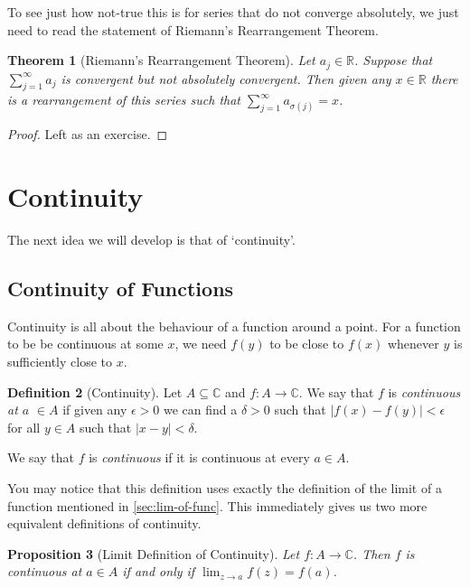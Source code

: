 \documentclass[11pt, a4paper]{article}
\newtheorem{theorem}{Theorem}[section]
\newtheorem{proposition}[theorem]{Proposition}
\theoremstyle{definition}
\newtheorem{definition}[theorem]{Definition}
\newcommand{\vocab}[1]{\emph{#1}} %
\newcommand{\C}{\mathbb{C}}
\newcommand{\R}{\mathbb{R}}
\begin{document}
To see just how not-true this is for series that do not converge absolutely, we just need to read the statement of Riemann's Rearrangement Theorem.

\begin{theorem}[Riemann's Rearrangement Theorem]
	Let $a_j \in \R$. Suppose that $\sum_{j = 1}^{\infty} a_j$ is convergent but not absolutely convergent. Then given any $x \in \R$ there is a rearrangement of this series such that $\sum_{j = 1}^{\infty} a_{\sigma(j)} = x$.
\end{theorem}
\begin{proof}
	Left as an exercise.
\end{proof}

\clearpage
\section{Continuity}

The next idea we will develop is that of `continuity'. 

\subsection{Continuity of Functions}

Continuity is all about the behaviour of a function around a point. For a function to be be continuous at some $x$, we need $f(y)$ to be close to $f(x)$ whenever $y$ is sufficiently close to $x$.

\begin{definition}[Continuity]
	Let $A \subseteq \C$ and $f: A \rightarrow \C$. We say that $f$ is \vocab{continuous at $a$} $\in A$ if given any $\epsilon > 0$ we can find a $\delta > 0$ such that $|f(x) - f(y)| < \epsilon$ for all $y \in A$ such that $|x - y| < \delta$.


	We say that $f$ is \vocab{continuous} if it is continuous at every $a \in A$.
\end{definition}

You may notice that this definition uses exactly the definition of the limit of a function mentioned in \autoref{sec:lim-of-func}. This immediately gives us two more equivalent definitions of continuity.

\begin{proposition}[Limit Definition of Continuity]
	Let $f: A \rightarrow \C$. Then $f$ is continuous at $a \in A$ if and only if $\displaystyle \lim_{z \to a} f(z) = f(a)$.
\end{proposition}
\end{document}
